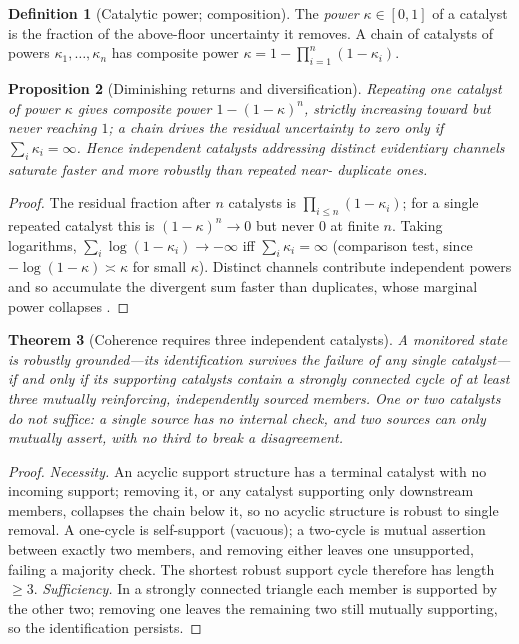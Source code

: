 \documentclass[11pt,twocolumn,a4paper]{article}
\theoremstyle{thmstyle}
\newtheorem{theorem}{Theorem}[section]
\newtheorem{proposition}[theorem]{Proposition}
\theoremstyle{definition}
\newtheorem{definition}[theorem]{Definition}
\theoremstyle{remark}
\begin{document}
\begin{definition}[Catalytic power; composition]
\label{def:power}
The \emph{power} $\kappa\in[0,1]$ of a catalyst is the fraction of the
above-floor uncertainty it removes. A chain of catalysts of powers
$\kappa_1,\dots,\kappa_n$ has composite power
$\kappa=1-\prod_{i=1}^{n}(1-\kappa_i)$.
\end{definition}

\begin{proposition}[Diminishing returns and diversification]
\label{prop:diminishing}
Repeating one catalyst of power $\kappa$ gives composite power
$1-(1-\kappa)^n$, strictly increasing toward but never reaching $1$; a
chain drives the residual uncertainty to zero only if
$\sum_i\kappa_i=\infty$. Hence independent catalysts addressing distinct
evidentiary channels saturate faster and more robustly than repeated near-
duplicate ones.
\end{proposition}

\begin{proof}
The residual fraction after $n$ catalysts is $\prod_{i\le n}(1-\kappa_i)$;
for a single repeated catalyst this is $(1-\kappa)^n\to0$ but never $0$ at
finite $n$. Taking logarithms, $\sum_i\log(1-\kappa_i)\to-\infty$ iff
$\sum_i\kappa_i=\infty$ (comparison test, since $-\log(1-\kappa)\asymp
\kappa$ for small $\kappa$). Distinct channels contribute independent
powers and so accumulate the divergent sum faster than duplicates, whose
marginal power collapses \citep{cover2006elements}.
\end{proof}

\begin{theorem}[Coherence requires three independent catalysts]
\label{thm:triangle}
A monitored state is robustly grounded---its identification survives the
failure of any single catalyst---if and only if its supporting catalysts
contain a strongly connected cycle of at least three mutually reinforcing,
independently sourced members. One or two catalysts do not suffice: a
single source has no internal check, and two sources can only mutually
assert, with no third to break a disagreement.
\end{theorem}

\begin{proof}
\emph{Necessity.} An acyclic support structure has a terminal catalyst with
no incoming support; removing it, or any catalyst supporting only
downstream members, collapses the chain below it, so no acyclic structure
is robust to single removal. A one-cycle is self-support (vacuous); a
two-cycle is mutual assertion between exactly two members, and removing
either leaves one unsupported, failing a majority check. The shortest
robust support cycle therefore has length $\ge3$.
\emph{Sufficiency.} In a strongly connected triangle each member is
supported by the other two; removing one leaves the remaining two still
mutually supporting, so the identification persists.
\end{proof}
\end{document}
